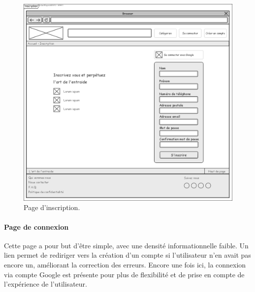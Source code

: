 \documentclass[a4paper,11pt]{article}
\begin{document}
\begin{figure}[H]
  \includegraphics[width=\linewidth]{images/maquette-inscription.png}
  \caption{Page d'inscription.}
  \label{fig:maquette-inscription}
\end{figure}
\newpage

\paragraph{Page de connexion}

Cette page a pour but d'être simple, avec une densité informationnelle faible.
Un lien permet de rediriger vers la création d'un compte si l'utilisateur n'en
avait pas encore un, améliorant la correction des erreurs.
Encore une fois ici, la connexion via compte Google est présente pour plus de
flexibilité et de prise en compte de l'expérience de l'utilisateur.
\end{document}
